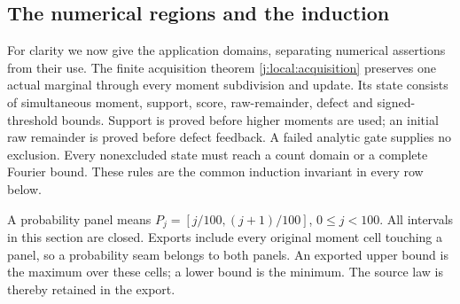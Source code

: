\subsection{The numerical regions and the induction}
\label{j:finite:assembly}
For clarity we now give the application domains, separating
numerical assertions from their use. The finite acquisition theorem
\ref{j:local:acquisition} preserves one actual marginal through every
moment subdivision and update. Its state consists of simultaneous moment,
support, score, raw-remainder, defect and signed-threshold bounds. Support
is proved before higher moments are used; an initial raw remainder is
proved before defect feedback. A failed analytic gate supplies no exclusion.
Every nonexcluded state must reach a count domain or a complete Fourier
bound. These rules are the common induction invariant in every row below.

A probability panel means $P_j=[j/100,(j+1)/100]$, $0\le j<100$.
All intervals in this section are closed. Exports include every original
moment cell touching a panel, so a probability seam belongs to both panels.
An exported upper bound is the maximum over these cells; a lower bound is
the minimum. The source law is thereby retained in the export.

